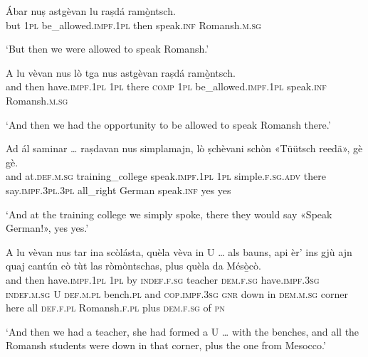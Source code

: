 \begin{linenumbers}
\gll    Ábar nuṣ astgèvan lu raṣdá ramò̱ntsch.\\
but \textsc{1pl}  be\_allowed.\textsc{impf.1pl} then speak.\textsc{inf} Romansh.\textsc{m.sg}\\
\end{linenumbers}
\medskip
\glt `But then we were allowed to speak Romansh.'
\medskip

\begin{linenumbers}
\gll    A lu vèvan nus lò tga nus astgèvan raṣdá ramò̱ntsch.\\
and then have.\textsc{impf.1pl} \textsc{1pl} there \textsc{comp} \textsc{1pl} be\_allowed.\textsc{impf.1pl} speak.\textsc{inf} Romansh.\textsc{m.sg} \\
\end{linenumbers}
\medskip
\glt `And then we had the opportunity to be allowed to speak Romansh there.'
\medskip

\begin{linenumbers}
\gll    Ad ál saminar … raṣdavan nus simplamajn, lò ṣchèvani schòn «Tüütsch reedä»\footnotemark, gè gè.\\
and at.\textsc{def.m.sg} training\_college {} speak.\textsc{impf.1pl} \textsc{1pl} simple.\textsc{f.sg.adv} there  say.\textsc{impf.3pl.3pl} all\_right German speak.\textsc{inf} yes yes \\
\end{linenumbers}
\medskip
\glt `And at the training college we simply spoke, there they would say «Speak German!», yes  yes.'
\medskip

\begin{linenumbers}
\gll    A lu vèvan nus tar ina scòlásta, quèla vèva in U … als bauns, api èr’ ins gjù ajn quaj cantún cò tùt las ròmòntschas, plus quèla da Mésò̱cò.\footnotemark\\
and then have.\textsc{impf.1pl} \textsc{1pl} by \textsc{indef.f.sg} teacher \textsc{dem.f.sg}  have.\textsc{impf.3sg} \textsc{indef.m.sg} U {} \textsc{def.m.pl} bench.\textsc{pl} and \textsc{cop.impf.3sg} \textsc{gnr} down in \textsc{dem.m.sg} corner here all \textsc{def.f.pl} Romansh.\textsc{f.pl} plus \textsc{dem.f.sg} of \textsc{pn}\\
\end{linenumbers}
\medskip
\glt `And then we had a teacher, she had formed a U … with the benches, and all the Romansh students were down in that corner, plus the one from Mesocco.'
\medskip

